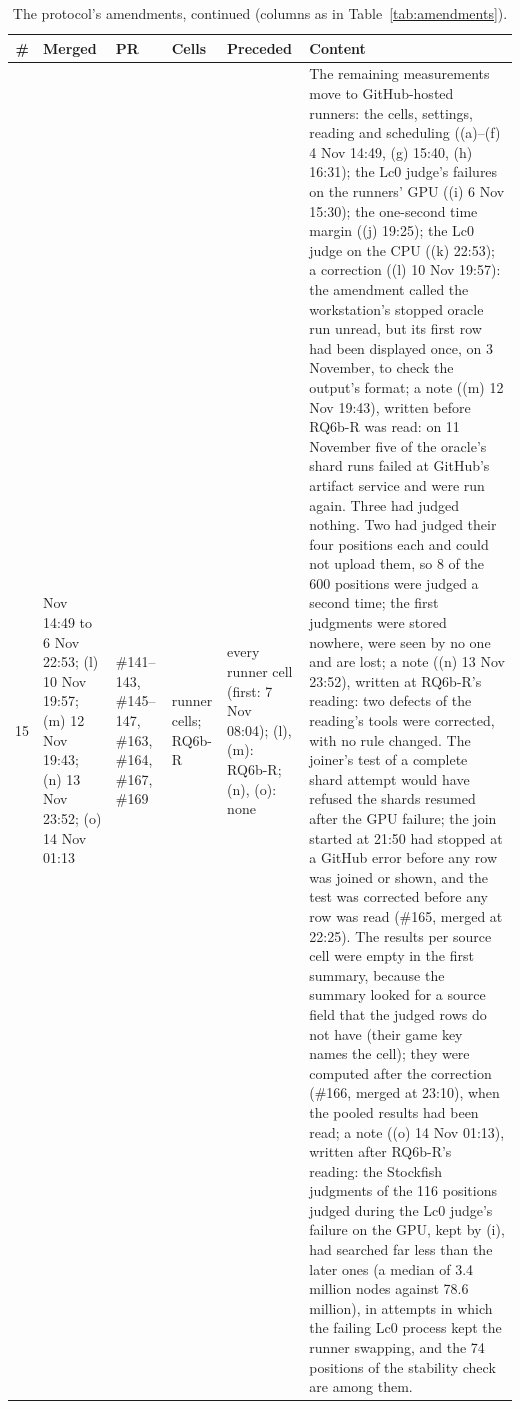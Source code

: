 \documentclass{article}
\begin{document}
\begin{table}[ht]
\centering
\caption{The protocol's amendments, continued (columns as in Table~\ref{tab:amendments}).}
\label{tab:amendments-c}
\footnotesize
\setlength{\tabcolsep}{3pt}
\begin{tabular}{r>{\raggedright\arraybackslash}p{1.95cm}>{\raggedright\arraybackslash}p{1.1cm}>{\raggedright\arraybackslash}p{2.0cm}>{\raggedright\arraybackslash}p{2.1cm}>{\raggedright\arraybackslash}p{6.85cm}}
\toprule
\# & Merged & PR & Cells & Preceded & Content \\
\midrule
15 & 4 Nov 14:49 to 6 Nov 22:53; (l) 10 Nov 19:57; (m) 12 Nov 19:43; (n) 13 Nov 23:52; (o) 14 Nov 01:13 & \#141--143, \#145--147, \#163, \#164, \#167, \#169 & runner cells; RQ6b-R & every runner cell (first: 7 Nov 08:04); (l), (m): RQ6b-R; (n), (o): none & The remaining measurements move to GitHub-hosted runners: the cells, settings, reading and scheduling ((a)--(f) 4 Nov 14:49, (g) 15:40, (h) 16:31); the Lc0 judge's failures on the runners' GPU ((i) 6 Nov 15:30); the one-second time margin ((j) 19:25); the Lc0 judge on the CPU ((k) 22:53); a correction ((l) 10 Nov 19:57): the amendment called the workstation's stopped oracle run unread, but its first row had been displayed once, on 3 November, to check the output's format; a note ((m) 12 Nov 19:43), written before RQ6b-R was read: on 11 November five of the oracle's shard runs failed at GitHub's artifact service and were run again. Three had judged nothing. Two had judged their four positions each and could not upload them, so 8 of the 600 positions were judged a second time; the first judgments were stored nowhere, were seen by no one and are lost; a note ((n) 13 Nov 23:52), written at RQ6b-R's reading: two defects of the reading's tools were corrected, with no rule changed. The joiner's test of a complete shard attempt would have refused the shards resumed after the GPU failure; the join started at 21:50 had stopped at a GitHub error before any row was joined or shown, and the test was corrected before any row was read (\#165, merged at 22:25). The results per source cell were empty in the first summary, because the summary looked for a source field that the judged rows do not have (their game key names the cell); they were computed after the correction (\#166, merged at 23:10), when the pooled results had been read; a note ((o) 14 Nov 01:13), written after RQ6b-R's reading: the Stockfish judgments of the 116 positions judged during the Lc0 judge's failure on the GPU, kept by (i), had searched far less than the later ones (a median of 3.4 million nodes against 78.6 million), in attempts in which the failing Lc0 process kept the runner swapping, and the 74 positions of the stability check are among them. \\

\end{tabular}
\end{table}
\end{document}
